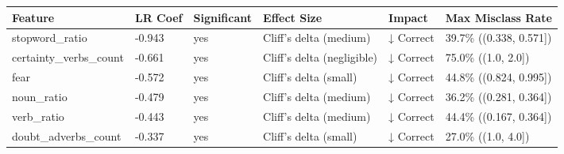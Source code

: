 \begin{tabular}{llllll}
\toprule
Feature & LR Coef & Significant & Effect Size & Impact & Max Misclass Rate \\
\midrule
stopword\_ratio & -0.943 & yes & Cliff's delta (medium) & ↓ Correct & 39.7\% ((0.338, 0.571]) \\
certainty\_verbs\_count & -0.661 & yes & Cliff's delta (negligible) & ↓ Correct & 75.0\% ((1.0, 2.0]) \\
fear & -0.572 & yes & Cliff's delta (small) & ↓ Correct & 44.8\% ((0.824, 0.995]) \\
noun\_ratio & -0.479 & yes & Cliff's delta (medium) & ↓ Correct & 36.2\% ((0.281, 0.364]) \\
verb\_ratio & -0.443 & yes & Cliff's delta (medium) & ↓ Correct & 44.4\% ((0.167, 0.364]) \\
doubt\_adverbs\_count & -0.337 & yes & Cliff's delta (small) & ↓ Correct & 27.0\% ((1.0, 4.0]) \\
\bottomrule
\end{tabular}

